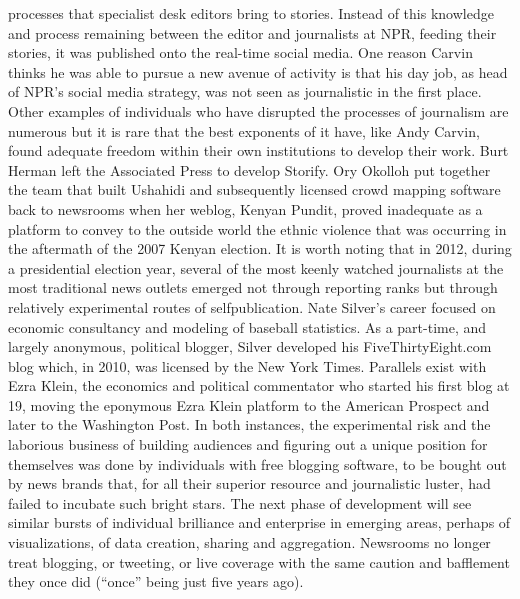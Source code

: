 processes that specialist desk editors bring to stories. Instead of this knowledge
and process remaining between the editor and journalists at NPR, feeding their
stories, it was published onto the real-time social media. One reason Carvin
thinks he was able to pursue a new avenue of activity is that his day job, as head
of NPR’s social media strategy, was not seen as journalistic in the first place.
Other examples of individuals who have disrupted the processes of journalism are
numerous but it is rare that the best exponents of it have, like Andy Carvin, found
adequate freedom within their own institutions to develop their work. Burt Herman
left the Associated Press to develop Storify. Ory Okolloh put together the
team that built Ushahidi and subsequently licensed crowd mapping software
back to newsrooms when her weblog, Kenyan Pundit, proved inadequate as a
platform to convey to the outside world the ethnic violence that was occurring
in the aftermath of the 2007 Kenyan election.
It is worth noting that in 2012, during a presidential election year, several of the
most keenly watched journalists at the most traditional news outlets emerged
not through reporting ranks but through relatively experimental routes of selfpublication.
Nate Silver’s career focused on economic consultancy and modeling
of baseball statistics. As a part-time, and largely anonymous, political blogger,
Silver developed his FiveThirtyEight.com blog which, in 2010, was licensed by
the New York Times.
Parallels exist with Ezra Klein, the economics and political commentator who
started his first blog at 19, moving the eponymous Ezra Klein platform to the
American Prospect and later to the Washington Post. In both instances, the
experimental risk and the laborious business of building audiences and figuring
out a unique position for themselves was done by individuals with free blogging
software, to be bought out by news brands that, for all their superior resource and
journalistic luster, had failed to incubate such bright stars.
The next phase of development will see similar bursts of individual brilliance
and enterprise in emerging areas, perhaps of visualizations, of data creation, sharing
and aggregation. Newsrooms no longer treat blogging, or tweeting, or live
coverage with the same caution and bafflement they once did (``once'' being just
five years ago).

